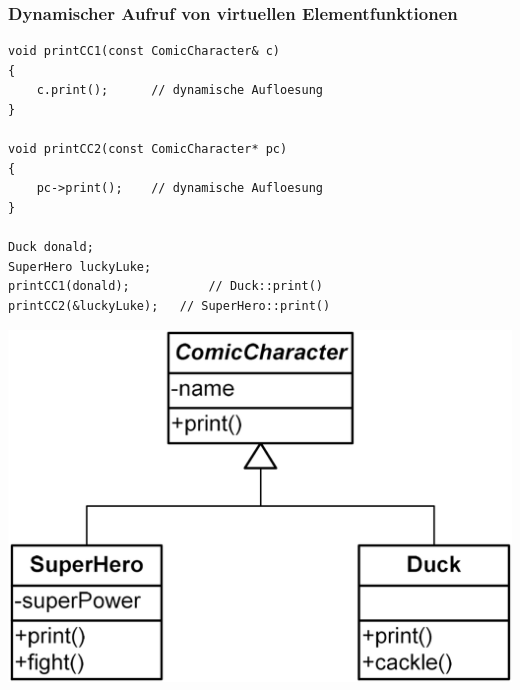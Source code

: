 \subsubsection{Dynamischer Aufruf von virtuellen Elementfunktionen}
\begin{minipage}{0.55\linewidth}
\vspace{-\baselineskip}
\begin{minipage}{\linewidth}
\begin{lstlisting}
void printCC1(const ComicCharacter& c)
{
	c.print();		// dynamische Aufloesung
}

void printCC2(const ComicCharacter* pc)
{
	pc->print();	// dynamische Aufloesung
}

Duck donald;
SuperHero luckyLuke;
printCC1(donald);			// Duck::print()
printCC2(&luckyLuke);	// SuperHero::print()
\end{lstlisting}
\end{minipage}
\end{minipage}%
\hfill
\begin{minipage}{0.4\linewidth}
	\includegraphics[width=\linewidth]{images/polymorphismus.png}
\end{minipage}


